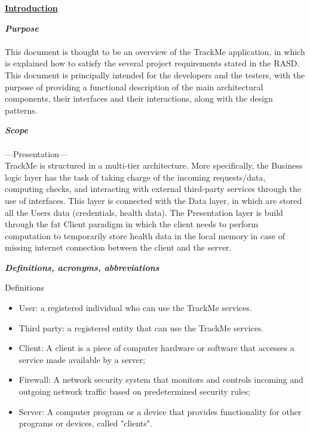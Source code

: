 	\underline{\textbf{Introduction} }
	\begin{legal}
    		\item \textit{\textbf{Purpose}}\\\\
		This document is thought to be an overview of the TrackMe application, in which is explained how to satisfy the several project requirements stated in the RASD. This document is principally intended for the developers and the testers, with the purpose of providing a functional description of the main architectural components, their interfaces and their interactions, along with the design patterns.
		\item \textit{\textbf{Scope}}\\\\
		---Presentation---\\ 
		TrackMe is structured in a multi-tier architecture. More specifically, the Business logic layer has the task of taking charge of the incoming requests/data, computing checks, and interacting with external third-party services through the use of interfaces. This layer is connected with the Data layer, in which are stored all the Users data (credentials, health data). The Presentation layer is build through the fat Client paradigm in which the client needs to perform computation to temporarily store health data in the local memory in case of missing internet connection between the client and the server.
		\item \textit{\textbf{Definitions, acronyms, abbreviations}}\\
			\begin{legal}
				\item Definitions
				\begin{itemize}
					\item User: a registered individual who can use the TrackMe services.
					\item Third party: a registered entity that can use the TrackMe services.
					\item Client: A client is a piece of computer hardware or software that accesses a service made available by a server;
					\item Firewall: A network security system that monitors and controls incoming and outgoing network traffic based on predetermined security rules;
					\item Server: A computer program or a device that provides functionality for other programs or devices, called "clients".
				\end{itemize}

\end{legal}
\end{legal}
